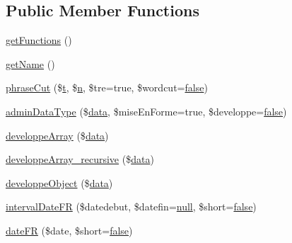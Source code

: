 \subsection*{Public Member Functions}
\begin{DoxyCompactItemize}
\item 
\hyperlink{class_acme_group_1_1services_1_1aetools_1_1twig_aetools_ab60ca713b14ec239d6851b13163b2ea0}{get\+Functions} ()
\item 
\hyperlink{class_acme_group_1_1services_1_1aetools_1_1twig_aetools_ab1e0ecbc84931ea709c915a543c39692}{get\+Name} ()
\item 
\hyperlink{class_acme_group_1_1services_1_1aetools_1_1twig_aetools_a2deaaefede9287869ed81b0784aefe27}{phrase\+Cut} (\$\hyperlink{jquery_8knob_8js_aa09e7cf223942a40813c00a3897b7c48}{t}, \$\hyperlink{fullpage_2plugin_8min_8js_ab767a859d1217315f42c9bb52fc648dc}{n}, \$tre=true, \$wordcut=\hyperlink{validate_8js_a5df37b7f02e5cdc7d9412b7f872b8e01}{false})
\item 
\hyperlink{class_acme_group_1_1services_1_1aetools_1_1twig_aetools_aa0fe6d11a121367b89ef8699ad4442e5}{admin\+Data\+Type} (\$\hyperlink{fullpage_2plugin_8js_a718c1bf5a3bf21ebb980203b142e5b75}{data}, \$mise\+En\+Forme=true, \$developpe=\hyperlink{validate_8js_a5df37b7f02e5cdc7d9412b7f872b8e01}{false})
\item 
\hyperlink{class_acme_group_1_1services_1_1aetools_1_1twig_aetools_a82ea3537f2813ec3c8f48e65219df431}{developpe\+Array} (\$\hyperlink{fullpage_2plugin_8js_a718c1bf5a3bf21ebb980203b142e5b75}{data})
\item 
\hyperlink{class_acme_group_1_1services_1_1aetools_1_1twig_aetools_a1b0301b844fbd811c86134fe8134876b}{developpe\+Array\+\_\+recursive} (\$\hyperlink{fullpage_2plugin_8js_a718c1bf5a3bf21ebb980203b142e5b75}{data})
\item 
\hyperlink{class_acme_group_1_1services_1_1aetools_1_1twig_aetools_a0447dc3627192debb7521b9697c539e2}{developpe\+Object} (\$\hyperlink{fullpage_2plugin_8js_a718c1bf5a3bf21ebb980203b142e5b75}{data})
\item 
\hyperlink{class_acme_group_1_1services_1_1aetools_1_1twig_aetools_ac2d38280847ab2593153b5fd5573b2e2}{interval\+Date\+F\+R} (\$datedebut, \$datefin=\hyperlink{validate_8js_afb8e110345c45e74478894341ab6b28e}{null}, \$short=\hyperlink{validate_8js_a5df37b7f02e5cdc7d9412b7f872b8e01}{false})
\item 
\hyperlink{class_acme_group_1_1services_1_1aetools_1_1twig_aetools_a0d69e0c4318a03018607d190a487f494}{date\+F\+R} (\$date, \$short=\hyperlink{validate_8js_a5df37b7f02e5cdc7d9412b7f872b8e01}{false})

\end{DoxyCompactItemize}

